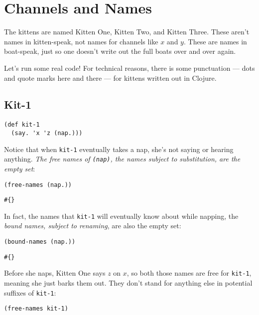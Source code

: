 \documentclass[10pt,oneside,x11names]{article}
\theoremstyle{definition}
\theoremstyle{warning}
\begin{document}
\section{Channels and Names}
\label{sec:org3620a48}

The kittens are named Kitten One, Kitten Two, and Kitten
Three. These aren't names in kitten-speak, not names for
channels like \(x\) and \(y\). These are names in boat-speak, just
so one doesn't write out the full boats over and over again.

Let's run some real code! For technical reasons, there is some
punctuation --- dots and quote marks here and there --- for
kittens written out in Clojure.

\subsection{Kit-1}
\label{sec:org9da941d}

\vskip 0.26cm
\begin{verbatim}
(def kit-1
  (say. 'x 'z (nap.)))
\end{verbatim}

Notice that when \texttt{kit-1} eventually takes a nap, she's not
saying or hearing anything. \emph{The free names of \texttt{(nap)}, the
names subject to substitution, are the empty set}:

\vskip 0.26cm
\begin{verbatim}
(free-names (nap.))
\end{verbatim}

\begin{verbatim}
#{}
\end{verbatim}


In fact, the names that \texttt{kit-1} will eventually know about while
napping, the \emph{bound names, subject to renaming}, are also the
empty set:

\vskip 0.26cm
\begin{verbatim}
(bound-names (nap.))
\end{verbatim}

\begin{verbatim}
#{}
\end{verbatim}


Before she naps, Kitten One says \(z\) on \(x\), so both those names
are free for \texttt{kit-1}, meaning she just barks them out. They don't
stand for anything else in potential suffixes of \texttt{kit-1}:

\vskip 0.26cm
\begin{verbatim}
(free-names kit-1)
\end{verbatim}
\end{document}
